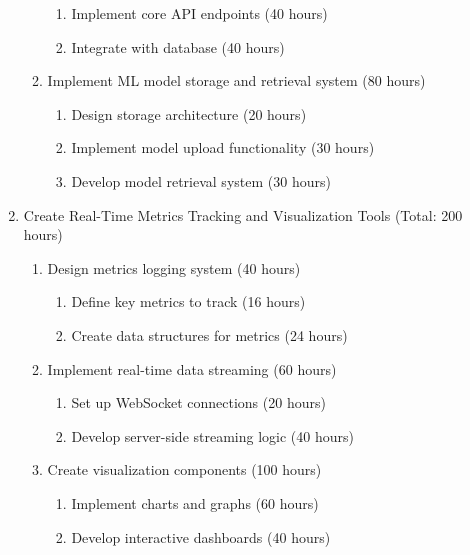 \documentclass[12pt]{article}
\begin{document}
\begin{enumerate}
\begin{enumerate}
\begin{enumerate}
            \item Implement core API endpoints (40 hours)
            \item Integrate with database (40 hours)
        \end{enumerate}
        \item Implement ML model storage and retrieval system (80 hours)
        \begin{enumerate}
            \item Design storage architecture (20 hours)
            \item Implement model upload functionality (30 hours)
            \item Develop model retrieval system (30 hours)
        \end{enumerate}
    \end{enumerate}

    \item Create Real-Time Metrics Tracking and Visualization Tools (Total: 200 hours)
    \begin{enumerate}
        \item Design metrics logging system (40 hours)
        \begin{enumerate}
            \item Define key metrics to track (16 hours)
            \item Create data structures for metrics (24 hours)
        \end{enumerate}
        \item Implement real-time data streaming (60 hours)
        \begin{enumerate}
            \item Set up WebSocket connections (20 hours)
            \item Develop server-side streaming logic (40 hours)
        \end{enumerate}
        \item Create visualization components (100 hours)
        \begin{enumerate}
            \item Implement charts and graphs (60 hours)
            \item Develop interactive dashboards (40 hours)
        \end{enumerate}
    \end{enumerate}


\end{enumerate}
\end{document}
